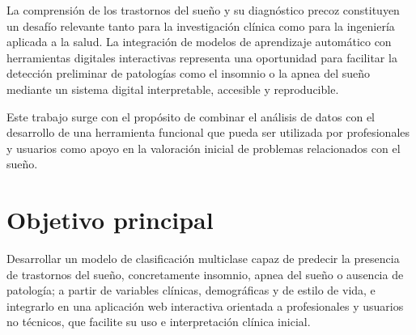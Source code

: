 
La comprensión de los trastornos del sueño y su diagnóstico precoz constituyen un desafío relevante tanto para la investigación clínica como para la ingeniería aplicada a la salud. La integración de modelos de aprendizaje automático con herramientas digitales interactivas representa una oportunidad para facilitar la detección preliminar de patologías como el insomnio o la apnea del sueño mediante un sistema digital interpretable, accesible y reproducible.

Este trabajo surge con el propósito de combinar el análisis de datos con el desarrollo de una herramienta funcional que pueda ser utilizada por profesionales y usuarios como apoyo en la valoración inicial de problemas relacionados con el sueño.



\section{Objetivo principal}

Desarrollar un modelo de clasificación multiclase capaz de predecir la presencia de trastornos del sueño, concretamente insomnio, apnea del sueño o ausencia de patología; a partir de variables clínicas, demográficas y de estilo de vida, e integrarlo en una aplicación web interactiva orientada a profesionales y usuarios no técnicos, que facilite su uso e interpretación clínica inicial.

